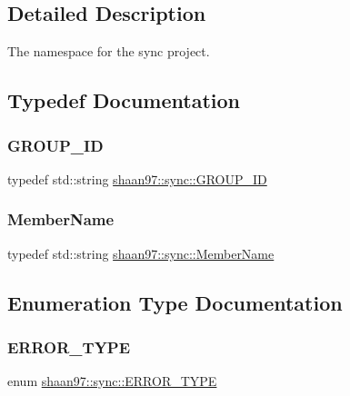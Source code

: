 \subsection{Detailed Description}
The namespace for the sync project. 

\subsection{Typedef Documentation}
\mbox{\label{namespaceshaan97_1_1sync_a34cebf175d27dfc3d82f24608f7043c1}} 
\subsubsection{\texorpdfstring{G\+R\+O\+U\+P\+\_\+\+ID}{GROUP\_ID}}
{\footnotesize\ttfamily typedef std\+::string \hyperlink{namespaceshaan97_1_1sync_a34cebf175d27dfc3d82f24608f7043c1}{shaan97\+::sync\+::\+G\+R\+O\+U\+P\+\_\+\+ID}}

\mbox{\label{namespaceshaan97_1_1sync_af59c2c9185f7cde547b79fbe0bf8ec71}} 
\subsubsection{\texorpdfstring{Member\+Name}{MemberName}}
{\footnotesize\ttfamily typedef std\+::string \hyperlink{namespaceshaan97_1_1sync_af59c2c9185f7cde547b79fbe0bf8ec71}{shaan97\+::sync\+::\+Member\+Name}}



\subsection{Enumeration Type Documentation}
\mbox{\label{namespaceshaan97_1_1sync_a69f4d5572314be52626f6a1c8ecc8db9}} 
\subsubsection{\texorpdfstring{E\+R\+R\+O\+R\+\_\+\+T\+Y\+PE}{ERROR\_TYPE}}
{\footnotesize\ttfamily enum \hyperlink{namespaceshaan97_1_1sync_a69f4d5572314be52626f6a1c8ecc8db9}{shaan97\+::sync\+::\+E\+R\+R\+O\+R\+\_\+\+T\+Y\+PE}}

